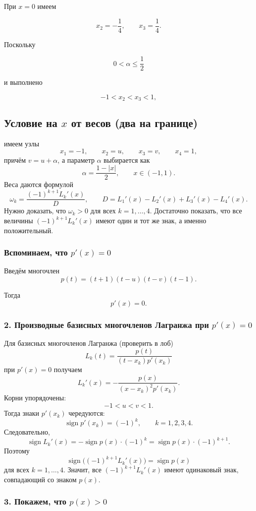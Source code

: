 \documentclass[12pt,a4paper]{article}
\begin{document}
	При $x=0$ имеем
	
	$$
	\boxed{
		x_2=-\frac14,
		\qquad
		x_3=\frac14.
	}
	$$
	
	Поскольку
	
	$$
	0<\alpha\leq\frac12
	$$
	
	и выполнено
	
	$$
	-1<x_2<x_3<1,
	$$
		
	\subsection{Условие на $x$ от весов (два на границе)}
	
	
	имеем узлы
	\[
	x_1=-1,\qquad x_2=u,\qquad x_3=v,\qquad x_4=1,
	\]
	причём \(v=u+\alpha\), а параметр \(\alpha\) выбирается как
	\[
	\alpha=\frac{1-|x|}{2},\qquad x\in(-1,1).
	\]
	Веса даются формулой
	\[
	\omega_k=\frac{(-1)^{k+1}L_k'(x)}{D},\qquad
	D=L_1'(x)-L_2'(x)+L_3'(x)-L_4'(x).
	\]
	Нужно доказать, что \(\omega_k>0\) для всех \(k=1,\dots,4\). Достаточно показать, что все величины \((-1)^{k+1}L_k'(x)\) имеют один и тот же знак, а именно положительный.
	
	\subsubsection*{Вспоминаем, что \(p'(x)=0\)}
	
	Введём многочлен
	\[
	p(t)=(t+1)(t-u)(t-v)(t-1).
	\]
	
	\noindent Тогда
	\[
	p'(x)=0.
	\]

	\subsubsection*{2. Производные базисных многочленов Лагранжа при \(p'(x)=0\)}
	
	Для базисных многочленов Лагранжа (проверить в лоб)
	\[
	L_k(t)=\frac{p(t)}{(t-x_k)p'(x_k)}
	\]
	при \(p'(x)=0\) получаем
	\[
	L_k'(x)=-\frac{p(x)}{(x-x_k)^2p'(x_k)}.
	\]
	Корни упорядочены:
	\[
	-1<u<v<1.
	\]
	Тогда знаки \(p'(x_k)\) чередуются:
	\[
	\operatorname{sign}p'(x_k)=(-1)^k,\qquad k=1,2,3,4.
	\]
	Следовательно,
	\[
	\operatorname{sign}L_k'(x)
	=
	-\operatorname{sign}p(x)\cdot(-1)^k
	=
	\operatorname{sign}p(x)\cdot(-1)^{k+1}.
	\]
	Поэтому
	\[
	\operatorname{sign}\bigl((-1)^{k+1}L_k'(x)\bigr)=\operatorname{sign}p(x)
	\]
	для всех \(k=1,\dots,4\). Значит, все \((-1)^{k+1}L_k'(x)\) имеют одинаковый знак, совпадающий со знаком \(p(x)\).
	
	\subsubsection*{3. Покажем, что \(p(x)>0\)}
	
\end{document}
